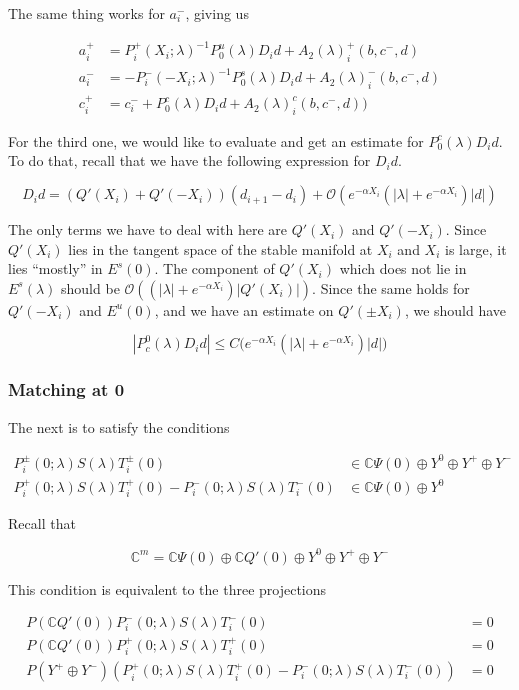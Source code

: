 \documentclass[12pt]{article}
\def\C{{\mathbb C}}
\begin{document}
The same thing works for $a_i^-$, giving us

\begin{align*}
a_i^+ &= P_i^+(X_i; \lambda)^{-1} P_0^u(\lambda) D_i d + A_2(\lambda)_i^+(b, c^-, d) \\
a_i^- &= -P_i^-(-X_i; \lambda)^{-1} P_0^s(\lambda) D_i d + A_2(\lambda)_i^-(b, c^-, d) \\
c_i^+ &= c_i^- + P_0^c(\lambda) D_i d + A_2(\lambda)_i^c(b, c^-, d) )
\end{align*}


For the third one, we would like to evaluate and get an estimate for $P_0^c(\lambda) D_i d$. To do that, recall that we have the following expression for $D_i d$.

\[
D_i d = ( Q'(X_i) + Q'(-X_i))(d_{i+1} - d_i ) + \mathcal{O} \left( e^{-\alpha X_i} \left( |\lambda| +  e^{-\alpha X_i}  \right) |d| \right)
\]

The only terms we have to deal with here are $Q'(X_i)$ and $Q'(-X_i)$. Since $Q'(X_i)$ lies in the tangent space of the stable manifold at $X_i$ and $X_i$ is large, it lies ``mostly'' in $E^s(0)$. The component of $Q'(X_i)$ which does not lie in $E^s(\lambda)$ should be $\mathcal{O}( (|\lambda| + e^{-\alpha X_i})|Q'(X_i)|)$. Since the same holds for $Q'(-X_i)$ and $E^u(0)$, and we have an estimate on $Q'(\pm X_i)$, we should have

\[
|P^0_c(\lambda) D_i d| \leq C \Big( e^{-\alpha X_i} \left( |\lambda| +  e^{-\alpha X_i}  \right) |d| \Big)
\]

\subsubsection*{Matching at 0}

The next is to satisfy the conditions

\begin{align*}
P_i^\pm(0; \lambda) S(\lambda) T_i^\pm(0) &\in \C \Psi(0) \oplus Y^0 \oplus Y^+ \oplus Y^- \\
P_i^+(0; \lambda) S(\lambda) T_i^+(0) - P_i^-(0; \lambda) S(\lambda) T_i^-(0) &\in \C \Psi(0) \oplus Y^0
\end{align*}

Recall that

\[
\C^m = \C \Psi(0) \oplus \C Q'(0) \oplus Y^0 \oplus Y^+ \oplus Y^- 
\]

This condition is equivalent to the three projections

\begin{align*}
P(\C Q'(0)) P_i^-(0; \lambda) S(\lambda) T_i^-(0) &= 0 \\
P(\C Q'(0)) P_i^+(0; \lambda) S(\lambda) T_i^+(0) &= 0 \\
P(Y^+ \oplus Y^-) ( P_i^+(0; \lambda) S(\lambda) T_i^+(0) - P_i^-(0; \lambda) S(\lambda) T_i^-(0) ) &= 0
\end{align*}
\end{document}

